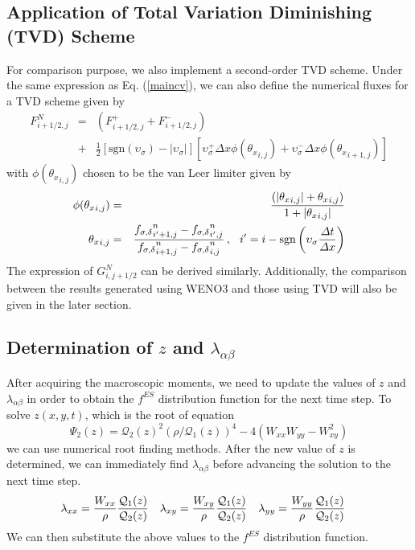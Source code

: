 \documentclass{rsproca}%
\begin{document}
\subsection{Application of Total Variation Diminishing (TVD) Scheme}
\label{TVD}
For comparison purpose, we also implement a second-order TVD scheme.  Under the same expression as Eq. (\ref{maincv}), we can also define the numerical fluxes for a TVD scheme given by
\begin{eqnarray}
F_{i+1/2,j}^N &=& \left(F_{i+1/2,j}^++F_{i+1/2,j}^-\right)\nonumber\\
&+&\frac{1}{2}\left[{\mbox{sgn}}(\upsilon_{\sigma})-|\upsilon_{\sigma}|\right]\left[\upsilon_\sigma^+\Delta x \phi({\theta_x}_{i,j})+\upsilon_\sigma^-\Delta x \phi({\theta_x}_{i+1,j})\right]
\end{eqnarray}
with $\phi({\theta_x}_{i,j})$ chosen to be the van Leer limiter \cite{vanLeer1979101} given by
\begin{eqnarray}
\phi({\theta_x}_{i,j})&=&\frac{(|{\theta_x}_{i,j}|+{\theta_x}_{i,j})}{1+|{\theta_x}_{i,j}|}\nonumber\\
{\theta_x}_{i,j}&=&\frac{{f_{\sigma,\delta}}_{i'+1,j}^{n}-{f_{\sigma,\delta}}_{i',j}^{n}}{{f_{\sigma,\delta}}_{i+1,j}^{n}-{f_{\sigma,\delta}}_{i,j}^{n}}\,,\hspace{0.1in} i'=i-{\mbox{sgn}}\left(\upsilon_\sigma\frac{\Delta t}{\Delta x}\right)
\end{eqnarray}
The expression of $G_{i,j+1/2}^N$ can be derived similarly. Additionally, the comparison between the results generated using WENO3 and those using TVD will also be given in the later section.
\subsection{Determination of $z$ and $\lambda_{\alpha \beta}$}
After acquiring the macroscopic moments, we need to update the values of $z$ and $\lambda_{\alpha \beta}$ in order to obtain the $f^{ES}$ distribution function for the next time step.  To solve $z(x,y,t)$, which is the root of equation
\begin{equation}
	\Psi_2(z)=\mathcal{Q}_{2}(z)^2 (\rho/\mathcal{Q}_{1}(z))^{4} - 4 (W_{xx} W_{yy} - W_{xy}^2)
\end{equation}
we can use numerical root finding methods.  After the new value of $z$ is determined, we can immediately find $\lambda_{\alpha \beta}$ before advancing the solution to the next time step.
\begin{align}
&\lambda_{xx} = {W_{xx} \over \rho} {\mathcal{Q}_{1}(z) \over \mathcal{Q}_{2}(z)}&
&\lambda_{xy} = {W_{xy} \over \rho} {\mathcal{Q}_{1}(z) \over \mathcal{Q}_{2}(z)}&
&\lambda_{yy} = {W_{yy} \over \rho} {\mathcal{Q}_{1}(z) \over \mathcal{Q}_{2}(z)}&
\end{align}
We can then substitute the above values to the $f^{ES}$ distribution function.
\end{document}
